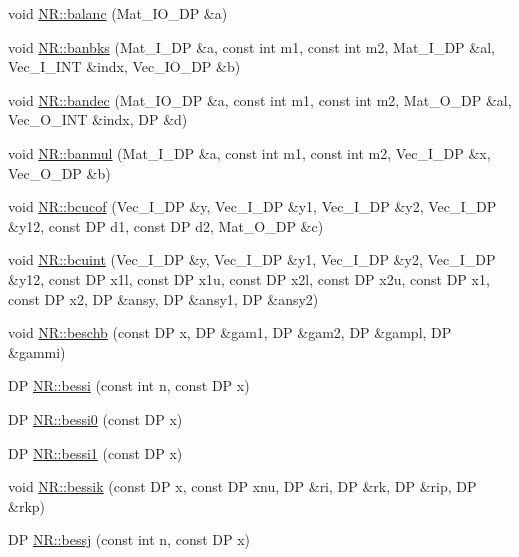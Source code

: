 \begin{DoxyCompactItemize}
\item 
void \mbox{\hyperlink{namespaceNR_a2684fb6923e5945cc4197b44eae4df56}{N\+R\+::balanc}} (Mat\+\_\+\+I\+O\+\_\+\+DP \&a)
\item 
void \mbox{\hyperlink{namespaceNR_af240c4551b9a0a9c5cde123be9205132}{N\+R\+::banbks}} (Mat\+\_\+\+I\+\_\+\+DP \&a, const int m1, const int m2, Mat\+\_\+\+I\+\_\+\+DP \&al, Vec\+\_\+\+I\+\_\+\+I\+NT \&indx, Vec\+\_\+\+I\+O\+\_\+\+DP \&b)
\item 
void \mbox{\hyperlink{namespaceNR_ad98237b2408813153be739eb27223c44}{N\+R\+::bandec}} (Mat\+\_\+\+I\+O\+\_\+\+DP \&a, const int m1, const int m2, Mat\+\_\+\+O\+\_\+\+DP \&al, Vec\+\_\+\+O\+\_\+\+I\+NT \&indx, DP \&d)
\item 
void \mbox{\hyperlink{namespaceNR_a6c1a4ae0a3f56dd2d6c3a24d04681fa0}{N\+R\+::banmul}} (Mat\+\_\+\+I\+\_\+\+DP \&a, const int m1, const int m2, Vec\+\_\+\+I\+\_\+\+DP \&x, Vec\+\_\+\+O\+\_\+\+DP \&b)
\item 
void \mbox{\hyperlink{namespaceNR_a82353f6fd70a72d599d3b4603afd3f43}{N\+R\+::bcucof}} (Vec\+\_\+\+I\+\_\+\+DP \&y, Vec\+\_\+\+I\+\_\+\+DP \&y1, Vec\+\_\+\+I\+\_\+\+DP \&y2, Vec\+\_\+\+I\+\_\+\+DP \&y12, const DP d1, const DP d2, Mat\+\_\+\+O\+\_\+\+DP \&c)
\item 
void \mbox{\hyperlink{namespaceNR_a607b5af26688cb0b3ba487bf2f36e19a}{N\+R\+::bcuint}} (Vec\+\_\+\+I\+\_\+\+DP \&y, Vec\+\_\+\+I\+\_\+\+DP \&y1, Vec\+\_\+\+I\+\_\+\+DP \&y2, Vec\+\_\+\+I\+\_\+\+DP \&y12, const DP x1l, const DP x1u, const DP x2l, const DP x2u, const DP x1, const DP x2, DP \&ansy, DP \&ansy1, DP \&ansy2)
\item 
void \mbox{\hyperlink{namespaceNR_a59a7410b6bb6b498a11bb530d8bf6f0c}{N\+R\+::beschb}} (const DP x, DP \&gam1, DP \&gam2, DP \&gampl, DP \&gammi)
\item 
DP \mbox{\hyperlink{namespaceNR_a17f13d2217a863a186aa76237c3c288b}{N\+R\+::bessi}} (const int n, const DP x)
\item 
DP \mbox{\hyperlink{namespaceNR_a225c3ef3fda946f4edce62f5e8b31840}{N\+R\+::bessi0}} (const DP x)
\item 
DP \mbox{\hyperlink{namespaceNR_a70a172f14124c10b796af212fdb125ec}{N\+R\+::bessi1}} (const DP x)
\item 
void \mbox{\hyperlink{namespaceNR_ac11d8c1819aee8d97aa4bdf944534212}{N\+R\+::bessik}} (const DP x, const DP xnu, DP \&ri, DP \&rk, DP \&rip, DP \&rkp)
\item 
DP \mbox{\hyperlink{namespaceNR_a92c1165db5f7c1972279d98ef34037d0}{N\+R\+::bessj}} (const int n, const DP x)

\end{DoxyCompactItemize}
